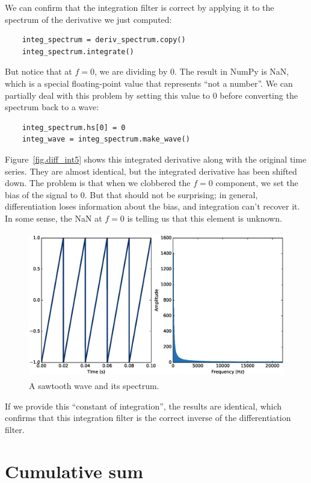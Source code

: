 \documentclass[12pt]{book}
\begin{document}
We can confirm that the integration filter is correct by applying it
to the spectrum of the derivative we just computed:

\begin{verbatim}
    integ_spectrum = deriv_spectrum.copy()
    integ_spectrum.integrate()
\end{verbatim}

But notice that at $f=0$, we are dividing by 0.  The result in
NumPy is NaN, which is a special floating-point value that
represents ``not a number''.  We can partially deal with this
problem by setting this value to 0 before converting the
spectrum back to a wave:

\begin{verbatim}
    integ_spectrum.hs[0] = 0
    integ_wave = integ_spectrum.make_wave()
\end{verbatim}

Figure~\ref{fig.diff_int5} shows this integrated derivative along with
the original time series.  They are almost identical, but the
integrated derivative has been shifted down.  The problem is that when
we clobbered the $f=0$ component, we set the bias of the signal to 0.
But that should not be surprising; in general, differentiation loses
information about the bias, and integration can't recover it.  In some
sense, the NaN at $f=0$ is telling us that this element is unknown.

\begin{figure}
\centerline{\includegraphics[height=2.5in]{figs/diff_int6.eps}}
\caption{A sawtooth wave and its spectrum.}
\label{fig.diff_int6}
\end{figure}

If we provide this ``constant of integration'', the results are
identical, which confirms that this integration filter is the correct
inverse of the differentiation filter.

\section{Cumulative sum}
\label{cumsum}
\end{document}
